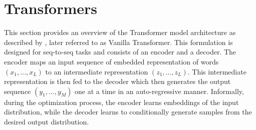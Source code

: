 \section{Transformers}
\label{sec:transformers}
This section provides an overview of the Transformer model architecture as described by \cite{vaswani2023attention}, later referred to as Vanilla Transformer. This formulation is designed for seq-to-seq tasks and consists of an encoder and a decoder. The encoder maps an input sequence of embedded representation of words $(x_1, \ldots, x_L)$ to an intermediate representation $(z_1, \ldots, z_L)$. This intermediate representation is then fed to the decoder which then generates the output sequence $(y_1, \dots, y_M)$ one at a time in an auto-regressive manner. Informally, during the optimization process, the encoder learns embeddings of the input distribution, while the decoder learns to conditionally generate samples from the desired output distribution.

